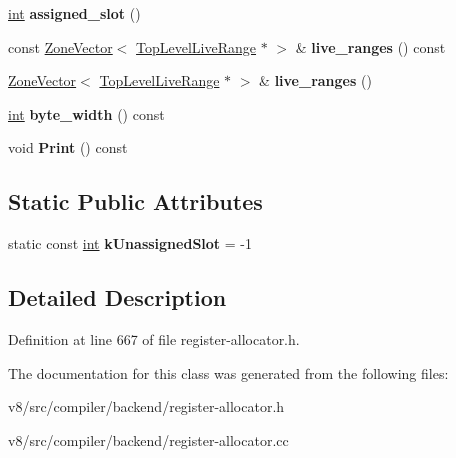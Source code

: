 \begin{DoxyCompactItemize}
\mbox{\hyperlink{classint}{int}} {\bfseries assigned\+\_\+slot} ()
\item 
\mbox{\label{classv8_1_1internal_1_1compiler_1_1SpillRange_aebdd50dc8988c2dd60bc99f3310f63ae}} 
const \mbox{\hyperlink{classv8_1_1internal_1_1ZoneVector}{Zone\+Vector}}$<$ \mbox{\hyperlink{classv8_1_1internal_1_1compiler_1_1TopLevelLiveRange}{Top\+Level\+Live\+Range}} $\ast$ $>$ \& {\bfseries live\+\_\+ranges} () const
\item 
\mbox{\label{classv8_1_1internal_1_1compiler_1_1SpillRange_a3265eaffe21a3c1b2665b587efe079a8}} 
\mbox{\hyperlink{classv8_1_1internal_1_1ZoneVector}{Zone\+Vector}}$<$ \mbox{\hyperlink{classv8_1_1internal_1_1compiler_1_1TopLevelLiveRange}{Top\+Level\+Live\+Range}} $\ast$ $>$ \& {\bfseries live\+\_\+ranges} ()
\item 
\mbox{\label{classv8_1_1internal_1_1compiler_1_1SpillRange_ac4b9711d32b3af11447755a769d1cff2}} 
\mbox{\hyperlink{classint}{int}} {\bfseries byte\+\_\+width} () const
\item 
\mbox{\label{classv8_1_1internal_1_1compiler_1_1SpillRange_ab2814a8565557ca22d0e59c7b1af4850}} 
void {\bfseries Print} () const
\end{DoxyCompactItemize}
\subsection*{Static Public Attributes}
\begin{DoxyCompactItemize}
\item 
\mbox{\label{classv8_1_1internal_1_1compiler_1_1SpillRange_a65b6e208d6e983bf6d27510bf4f4ae63}} 
static const \mbox{\hyperlink{classint}{int}} {\bfseries k\+Unassigned\+Slot} = -\/1
\end{DoxyCompactItemize}


\subsection{Detailed Description}


Definition at line 667 of file register-\/allocator.\+h.



The documentation for this class was generated from the following files\+:\begin{DoxyCompactItemize}
\item 
v8/src/compiler/backend/register-\/allocator.\+h\item 
v8/src/compiler/backend/register-\/allocator.\+cc\end{DoxyCompactItemize}

